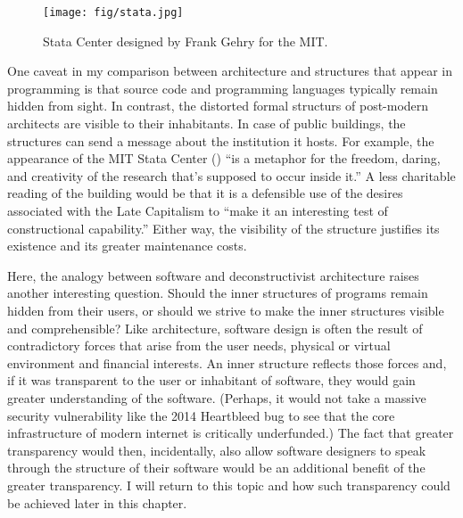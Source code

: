 \begin{figure}
\centering
\vspace{-1em}
\texttt{[image: fig/stata.jpg]}
\caption{Stata Center designed by Frank Gehry for the MIT.}
\label{fig:stata}
\vspace{-0.5em}
\end{figure}

One caveat in my comparison between architecture and structures that appear in programming is
that source code and programming languages typically remain hidden from sight. In contrast, the
distorted formal structurs of post-modern architects are visible to their inhabitants. In case of
public buildings, the structures can send a message about the institution it hosts. For example,
the appearance of the MIT Stata Center () ``is a metaphor for the freedom,
daring, and creativity of the research that's supposed to occur inside it.''
A less charitable reading of the building would be that it is a defensible use of the
desires associated with the Late Capitalism to ``make it an interesting test of constructional
capability.'' Either way, the
visibility of the structure justifies its existence and its greater maintenance costs.

Here, the analogy between software and deconstructivist architecture raises another interesting
question. Should the inner structures of programs remain hidden from their users, or should
we strive to make the inner structures visible and comprehensible?
Like architecture, software design is often the result of contradictory forces that
arise from the user needs, physical or virtual environment and financial interests.
An inner structure reflects those forces and, if it was transparent to the user or inhabitant
of software, they would gain greater understanding of the software. (Perhaps, it would not
take a massive security vulnerability like the 2014 Heartbleed bug to see that the core
infrastructure of modern internet is critically underfunded.)
The fact that greater transparency would then, incidentally, also allow software designers to
speak through the structure of their software would be an additional benefit of the greater
transparency. I will return to this topic and how such transparency could be achieved
later in this chapter.

